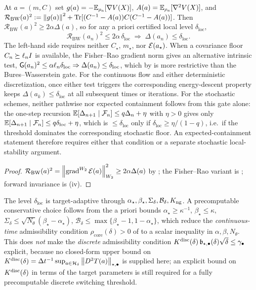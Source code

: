 \begin{proposition}
\label{prop:entry-residual}
At $a=(m,C)$ set $g(a)=-\mathbb{E}_{\rho_a}[\nabla V(X)]$, $A(a)=\mathbb{E}_{\rho_a}[\nabla^2V(X)]$, and
$\mathcal R_{\mathrm{BW}}(a)^2:=\left\lVert g(a)\right\rVert^2+\operatorname{Tr}[(C^{-1}-A(a))C(C^{-1}-A(a))]$. Then
$\mathcal R_{\mathrm{BW}}(a)^2\geq2\alpha\Delta(a)$, so for any a priori certified local level
$\delta_{\mathrm{loc}}$,
\[
    \mathcal R_{\mathrm{BW}}(a_n)^2\leq2\alpha\,\delta_{\mathrm{loc}}
    \;\Longrightarrow\;
    \Delta(a_n)\leq\delta_{\mathrm{loc}} .
\]
The left-hand side requires neither $C_\star$, $m_\star$, nor $\mathcal{E}(a_\star)$. When a covariance
floor $C_n\succeq\ell_nI$ is available, the Fisher--Rao gradient norm gives an alternative
intrinsic test, $\mathsf{G}(a_n)^2\leq\alpha\ell_n\delta_{\mathrm{loc}}\Rightarrow\Delta(a_n)\leq\delta_{\mathrm{loc}}$,
which by  is more restrictive than the Bures--Wasserstein gate. For the continuous
flow and either deterministic discretization, once either test triggers the corresponding
energy-descent property keeps $\Delta(a_k)\leq\delta_{\mathrm{loc}}$ at all subsequent times or
iterations. For the stochastic schemes, neither pathwise nor expected containment follows from this
gate alone: the one-step recursion $\mathbb{E}[\Delta_{n+1}\mid\mathcal{F}_n]\leq q\Delta_n+\eta$ with $\eta>0$ gives
only $\mathbb{E}[\Delta_{n+1}\mid\mathcal{F}_n]\leq q\delta_{\mathrm{loc}}+\eta$, which is $\leq\delta_{\mathrm{loc}}$
only if $\delta_{\mathrm{loc}}\geq\eta/(1-q)$, i.e.\ if the threshold dominates the corresponding
stochastic floor. An expected-containment statement therefore requires either that condition or a
separate stochastic local-stability argument.
\end{proposition}

\begin{proof}
$\mathcal R_{\mathrm{BW}}(a)^2=\left\lVert \operatorname{grad}^{W_2}\mathcal{E}(a)\right\rVert_{W_2}^2\geq2\alpha\Delta(a)$ by
; the Fisher--Rao variant is ; forward invariance is
(iv).
\end{proof}

\begin{remark}
\label{rem:threshold-computable}
The level $\delta_{\mathrm{loc}}$ is target-adaptive through
$\alpha_\star,\beta_\star,\Sigma_\delta,\mathcal B_\delta,K_{\mathrm{ng}}$. A precomputable conservative
choice follows from the a priori bounds $\alpha_\star\geq\kappa^{-1}$, $\beta_\star\leq\kappa$,
$\Sigma_\delta\leq\sqrt{N_\theta}(\beta_\star-\alpha_\star)$,
$\mathcal B_\delta\leq\max\{\beta_\star-1,1-\alpha_\star\}$, which reduce the \emph{continuous-time}
admissibility condition $\rho_{\mathrm{core}}(\delta)>0$ of  to a scalar
inequality in $\alpha,\beta,N_\theta$. This does \emph{not} make the \emph{discrete} admissibility
condition $K^{\mathrm{disc}}(\delta)\,\mathfrak b_{\star,\bullet}(\delta)\sqrt\delta\leq\gamma_\bullet$ explicit,
because no closed-form upper bound on $K^{\mathrm{disc}}(\delta)=\Delta t^{-1}\sup_{a\in\mathcal{H}_\delta}\left\lVert D^2T(a)\right\rVert_{\star,\bullet}$
is supplied here; an explicit bound on $K^{\mathrm{disc}}(\delta)$ in terms of the target parameters is still
required for a fully precomputable discrete switching threshold.
\end{remark}

